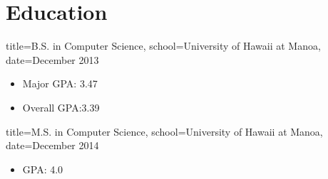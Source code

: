 \documentclass{resume}
\begin{document}

\makeheader

\section{Education}
\begin{degree}{title=B.S. in Computer Science,
               school=University of Hawaii at Manoa,
               date=December 2013}
    \begin{itemize}
        \item{Major GPA: 3.47}
        \item{Overall GPA:3.39}
    \end{itemize}
\end{degree}

\begin{degree}{title=M.S. in Computer Science,
               school=University of Hawaii at Manoa,
               date=December 2014}
    \begin{itemize}
        \item{GPA: 4.0}
    \end{itemize}
\end{degree}
\end{document}
